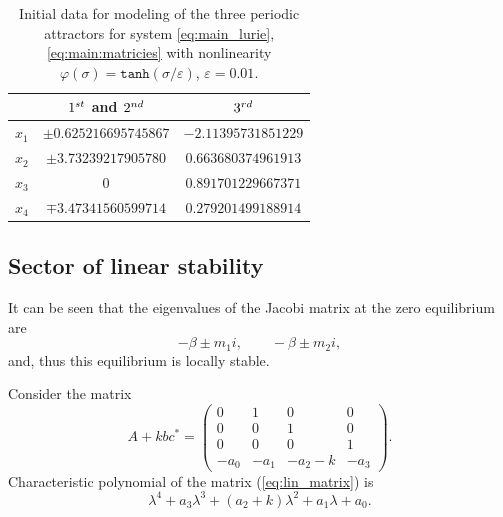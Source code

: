 \documentclass{ifacconf}
\theoremstyle{plain}
\begin{document}
\begin{table}[h!]
\begin{center}
\caption{Initial data for modeling of the three
periodic attractors for system \eqref{eq:main_lurie}, \eqref{eq:main:matricies}
with nonlinearity $\varphi(\sigma) = \texttt{tanh}(\sigma / \varepsilon)$,
$\varepsilon = 0.01$.}\label{tb:initial_data_tanh}
\begin{tabular}{ccc}
& $1^{\rm st}$ and $2^{\rm nd}$ & $3^{\rm rd}$\\
\hline\hline
$x_1$ & $\pm 0.625216695745867$ & $-2.11395731851229$ \\
$x_2$ & $\pm 3.73239217905780$ & $0.663680374961913$ \\
$x_3$ & $0$ & $0.891701229667371$ \\
$x_4$ & $\mp 3.47341560599714$ & $0.279201499188914$ \\
\hline
\end{tabular}
\end{center}
\end{table}

\subsection{Sector of linear stability}

It can be seen that the eigenvalues of the Jacobi matrix at the
zero equilibrium are
\begin{equation*}
  -\beta \pm m_1 i, \qquad -\beta \pm m_2 i,
\end{equation*}
and, thus this equilibrium is locally stable.

Consider the matrix
\begin{equation}\label{eq:lin_matrix}
  A + kbc^{*} = \left(
  \begin{array}{cccc}
    0 & 1 & 0 & 0 \\
    0 & 0 & 1 & 0 \\
    0 & 0 & 0 & 1  \\
    -a_0 & -a_1 & -a_2 - k & -a_3
  \end{array}
  \right).
\end{equation}
Characteristic polynomial of the matrix (\ref{eq:lin_matrix}) is
\begin{equation}\label{eq:char_polynom}
  \lambda^4 + a_3\lambda^3 + (a_2+k)\lambda^2 + a_1\lambda + a_0.
\end{equation}
\end{document}
